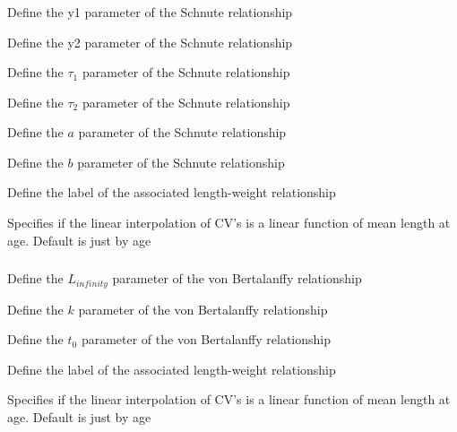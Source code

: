 \subsubsection[Schnute]{}

 {Define the y1 parameter of the Schnute relationship}

 {Define the y2 parameter of the Schnute relationship}

 {Define the $\tau_1$ parameter of the Schnute relationship}

 {Define the $\tau_2$ parameter of the Schnute relationship}

 {Define the $a$ parameter of the Schnute relationship}

 {Define the $b$ parameter of the Schnute relationship}

 {Define the label of the associated length-weight relationship}

 {Specifies if the linear interpolation of CV's is a linear function of mean length at age. Default is just by age}

\subsubsection[Von Bertalanffy]{}

 {Define the $L_{infinity}$ parameter of the von Bertalanffy relationship}

 {Define the $k$ parameter of the von Bertalanffy relationship}

 {Define the $t_0$ parameter of the von Bertalanffy relationship}

 {Define the label of the associated length-weight relationship}

 {Specifies if the linear interpolation of CV's is a linear function of mean length at age. Default is just by age}

